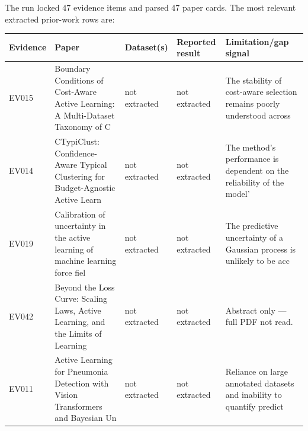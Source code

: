 \documentclass[
  11pt,
]{article}
\newcounter{none} %
\begin{document}
The run locked 47 evidence items and parsed 47 paper cards. The most relevant extracted prior-work rows are:

{\def\LTcaptype{none} %
\begin{longtable}[]{@{}
  >{\raggedright\arraybackslash}p{}
  >{\raggedright\arraybackslash}p{}
  >{\raggedright\arraybackslash}p{}
  >{\raggedright\arraybackslash}p{}
  >{\raggedright\arraybackslash}p{}@{}}
\toprule\noalign{}
\begin{minipage}[b]{\linewidth}\raggedright
Evidence
\end{minipage} & \begin{minipage}[b]{\linewidth}\raggedright
Paper
\end{minipage} & \begin{minipage}[b]{\linewidth}\raggedright
Dataset(s)
\end{minipage} & \begin{minipage}[b]{\linewidth}\raggedright
Reported result
\end{minipage} & \begin{minipage}[b]{\linewidth}\raggedright
Limitation/gap signal
\end{minipage} \\
\midrule\noalign{}
\endhead
\bottomrule\noalign{}
\endlastfoot
EV015 & Boundary Conditions of Cost-Aware Active Learning: A Multi-Dataset Taxonomy of C & not extracted & not extracted & The stability of cost-aware selection remains poorly understood across \\
EV014 & CTypiClust: Confidence-Aware Typical Clustering for Budget-Agnostic Active Learn & not extracted & not extracted & The method's performance is dependent on the reliability of the model' \\
EV019 & Calibration of uncertainty in the active learning of machine learning force fiel & not extracted & not extracted & The predictive uncertainty of a Gaussian process is unlikely to be acc \\
EV042 & Beyond the Loss Curve: Scaling Laws, Active Learning, and the Limits of Learning & not extracted & not extracted & Abstract only --- full PDF not read. \\
EV011 & Active Learning for Pneumonia Detection with Vision Transformers and Bayesian Un & not extracted & not extracted & Reliance on large annotated datasets and inability to quantify predict \\

\end{longtable}}
\end{document}
